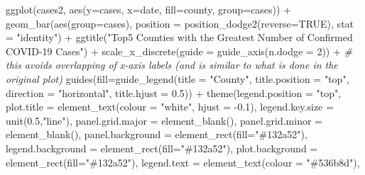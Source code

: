 \documentclass[
  12pt,
]{style/krantz}
\newenvironment{Shaded}{\begin{snugshade}}{\end{snugshade}}
\newcommand{\AttributeTok}[1]{\textcolor[rgb]{0.77,0.63,0.00}{#1}}
\newcommand{\CommentTok}[1]{\textcolor[rgb]{0.56,0.35,0.01}{\textit{#1}}}
\newcommand{\ConstantTok}[1]{\textcolor[rgb]{0.00,0.00,0.00}{#1}}
\newcommand{\DecValTok}[1]{\textcolor[rgb]{0.00,0.00,0.81}{#1}}
\newcommand{\FloatTok}[1]{\textcolor[rgb]{0.00,0.00,0.81}{#1}}
\newcommand{\FunctionTok}[1]{\textcolor[rgb]{0.00,0.00,0.00}{#1}}
\newcommand{\NormalTok}[1]{#1}
\newcommand{\SpecialCharTok}[1]{\textcolor[rgb]{0.00,0.00,0.00}{#1}}
\newcommand{\StringTok}[1]{\textcolor[rgb]{0.31,0.60,0.02}{#1}}
\begin{document}
\begin{Shaded}
\begin{Highlighting}[]
\FunctionTok{ggplot}\NormalTok{(cases2, }\FunctionTok{aes}\NormalTok{(}\AttributeTok{y=}\NormalTok{cases, }\AttributeTok{x=}\NormalTok{date, }\AttributeTok{fill=}\NormalTok{county, }\AttributeTok{group=}\NormalTok{cases)) }\SpecialCharTok{+}
  \FunctionTok{geom\_bar}\NormalTok{(}\FunctionTok{aes}\NormalTok{(}\AttributeTok{group=}\NormalTok{cases), }\AttributeTok{position =} \FunctionTok{position\_dodge2}\NormalTok{(}\AttributeTok{reverse=}\ConstantTok{TRUE}\NormalTok{), }\AttributeTok{stat =} \StringTok{"identity"}\NormalTok{) }\SpecialCharTok{+}
  \FunctionTok{ggtitle}\NormalTok{(}\StringTok{"Top5 Counties with the Greatest Number of Confirmed COVID{-}19 Cases"}\NormalTok{) }\SpecialCharTok{+}
  \FunctionTok{scale\_x\_discrete}\NormalTok{(}\AttributeTok{guide =} \FunctionTok{guide\_axis}\NormalTok{(}\AttributeTok{n.dodge =} \DecValTok{2}\NormalTok{)) }\SpecialCharTok{+}  \CommentTok{\# this avoids overlapping of x{-}axis labels (and is similar to what is done in the original plot)}
  \FunctionTok{guides}\NormalTok{(}\AttributeTok{fill=}\FunctionTok{guide\_legend}\NormalTok{(}\AttributeTok{title =} \StringTok{"County"}\NormalTok{,}
                           \AttributeTok{title.position =} \StringTok{"top"}\NormalTok{,}
                           \AttributeTok{direction =} \StringTok{"horizontal"}\NormalTok{,}
                           \AttributeTok{title.hjust =} \FloatTok{0.5}\NormalTok{)) }\SpecialCharTok{+}
  \FunctionTok{theme}\NormalTok{(}\AttributeTok{legend.position =} \StringTok{"top"}\NormalTok{,}
        \AttributeTok{plot.title =} \FunctionTok{element\_text}\NormalTok{(}\AttributeTok{colour =} \StringTok{"white"}\NormalTok{, }\AttributeTok{hjust =} \SpecialCharTok{{-}}\FloatTok{0.1}\NormalTok{),}
        \AttributeTok{legend.key.size =} \FunctionTok{unit}\NormalTok{(}\FloatTok{0.5}\NormalTok{,}\StringTok{"line"}\NormalTok{),}
        \AttributeTok{panel.grid.major =} \FunctionTok{element\_blank}\NormalTok{(),}
        \AttributeTok{panel.grid.minor =} \FunctionTok{element\_blank}\NormalTok{(),        }
        \AttributeTok{panel.background =} \FunctionTok{element\_rect}\NormalTok{(}\AttributeTok{fill=}\StringTok{"\#132a52"}\NormalTok{),}
        \AttributeTok{legend.background =} \FunctionTok{element\_rect}\NormalTok{(}\AttributeTok{fill=}\StringTok{"\#132a52"}\NormalTok{),}
        \AttributeTok{plot.background =} \FunctionTok{element\_rect}\NormalTok{(}\AttributeTok{fill=}\StringTok{"\#132a52"}\NormalTok{),}
        \AttributeTok{legend.text =} \FunctionTok{element\_text}\NormalTok{(}\AttributeTok{colour =} \StringTok{"\#536b8d"}\NormalTok{),}

\end{Highlighting}
\end{Shaded}
\end{document}
